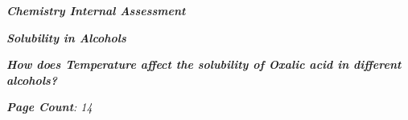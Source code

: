 

\begin{titlepage}
    \begin{center}
        \vspace*{1cm}
            
        \date{}
            
        \huge
            
        \textit{\textbf{Chemistry Internal Assessment}}
            
        \vspace{0.25cm}
            
        \hline
            
        \vspace{2.5cm}
            
        \textit{\textbf{Solubility in Alcohols}}
            
        \vspace{2.5cm}
            
        \LARGE
            
        \textit{\textbf{How does Temperature affect the solubility of Oxalic acid in different alcohols? }}
            
        \vspace{2.5cm}
            
        \Large
            
        \vspace{0.25cm}
        

		\vspace{1cm}            
            
		\Large		
		        
		\vspace{0.25cm} 
		
		\textit{\textbf{Page Count}: 14}
		   
            
        \vspace{2cm}
            
        \Large
         
		\vspace{0.25cm}         
            
            
        \vspace{0.25cm}
            
        \hline
           
            
    \end{center}
\end{titlepage}



